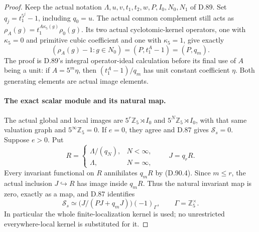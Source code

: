 \begin{proof}
Keep the actual notation \(\Lambda,u,v,t_1,t_2,w,P,I_0,N_0,N_1\)
of D.89. Set \(q_j=t_1^{5^j}-1\), including \(q_0=u\).
The actual common complement still acts as
\(\rho_A(g)=t_1^{A\kappa_5(g)}\rho_0(g)\).
Its two actual cyclotomic-kernel operators, one with
\(\kappa_5=0\) and primitive cubic coefficient and one
with \(\kappa_5=1\), give exactly
\[
       (\rho_A(g)-1:g\in N_0)=(P,t_1^A-1)=(P,q_m).
                                                               \tag{D.90.4}
\]
The proof is D.89's integral operator-ideal calculation before
its final use of \(A\) being a unit: if \(A=5^m\eta\),
then \((t_1^A-1)/q_m\) has unit constant coefficient
\(\eta\). Both generating elements are actual image elements.

\paragraph{The exact scalar module and its natural map.}
The actual global and local images are
\(5^r\mathbb Z_5\rtimes I_0\) and
\(5^N\mathbb Z_5\rtimes I_0\), with that same valuation
graph and \(5^\infty\mathbb Z_5=0\). If \(e=0\), they
agree and D.87 gives \(\mathcal S_s=0\).
Suppose \(e>0\). Put
\[
 R=\begin{cases}\Lambda/(q_N),&N<\infty,\\
                 \Lambda,&N=\infty,\end{cases}
                  \qquad J=q_rR.
\]
Every invariant functional on \(R\) annihilates \(q_mR\)
by (D.90.4). Since \(m\le r\), the actual inclusion
\(J\hookrightarrow R\) has image inside \(q_mR\).
Thus the natural invariant map is zero, exactly as a map,
and D.87 identifies
\[
 \mathcal S_s\simeq
              \bigl(J/(PJ+q_mJ)\bigr)(-1)_\Gamma,
                  \qquad \Gamma=\mathbb Z_5^\times.    \tag{D.90.5}
\]
In particular the whole finite-localization kernel is used;
no unrestricted everywhere-local kernel is substituted for it.


\end{proof}

